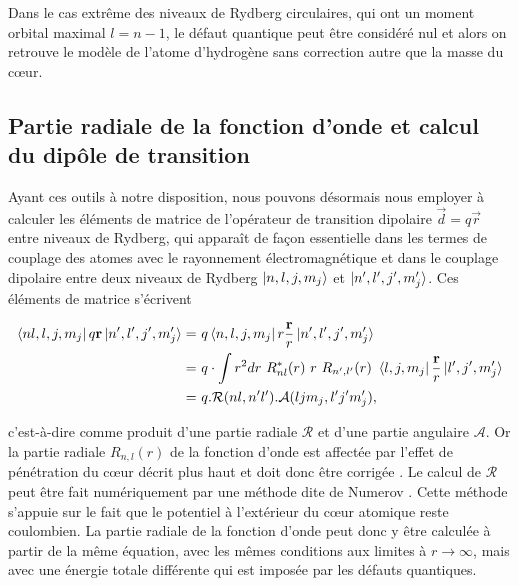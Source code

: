 Dans le cas extrême des niveaux de Rydberg circulaires, qui ont un moment orbital maximal $l=n-1$, le défaut quantique peut être considéré nul et alors on retrouve le modèle de l'atome d'hydrogène sans correction autre que la masse du c\oe ur.
		
	\subsection{Partie radiale de la fonction d'onde et calcul du dipôle de transition}
\noindent Ayant ces outils à notre disposition, nous pouvons désormais nous employer à calculer les éléments de matrice de l'opérateur de transition dipolaire $\vec{d}=q\vec{r}$ entre niveaux de Rydberg, qui apparaît de façon essentielle dans les termes de couplage des atomes avec le rayonnement électromagnétique et dans le couplage dipolaire entre deux niveaux de Rydberg $\ket{n,l,j,m_j}$ et $\ket{n',l',j',m_j'}$. Ces éléments de matrice s'écrivent

	\begin{equation}\label{eq:matrixelements}
	\begin{aligned}
	\bra{nl,l,j,m_j}q\mathbf{r}\ket{n',l',j',m_j'}= & ~q\bra{n,l,j,m_j} r\frac{\mathbf{r}}{r} \ket{n',l',j',m_j'} \\
	= & ~q\cdot \int r^2dr~R^*_{nl}(r)~r~R_{n',l'}(r)~ \bra{l,j,m_j}\frac{\mathbf{r}}{r}\ket{l',j',m_j'} \\
	= & ~q.\mathcal{R}(nl,n'l').\mathcal{A}(ljm_j,l'j'm_j')	 ,
	\end{aligned}
	\end{equation}
	
\noindent c'est-à-dire comme produit d'une partie radiale $\mathcal{R}$ et d'une partie angulaire $\mathcal{A}$.
Or la partie radiale $R_{n,l}(r)$ de la fonction d'onde est affectée par l'effet de pénétration du c\oe ur décrit plus haut et doit donc être corrigée \cite{TXT_GALLAGHER}.
Le calcul de $\mathcal{R}$ peut être fait numériquement par une méthode dite de Numerov \cite[pp.10-24]{TXT_GALLAGHER}.
Cette méthode s'appuie sur le fait que le potentiel à l'extérieur du c\oe ur atomique reste coulombien. La partie radiale de la fonction d'onde peut donc y être calculée à partir de la même équation, avec les mêmes conditions aux limites à $r \rightarrow \infty$, mais avec une énergie totale différente qui est imposée par les défauts quantiques.

